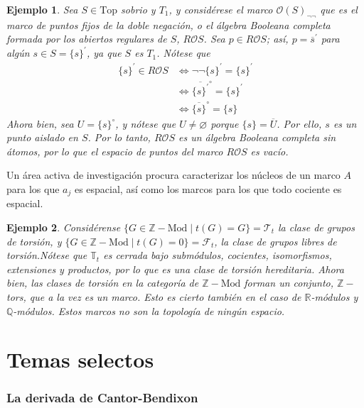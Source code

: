 \documentclass[12pt,letterpaper,titlepage]{article}
\let\emptyset\varnothing
\newtheorem*{exa}{Ejemplo}
\theoremstyle{definition}
\newcommand\<{\langle}
\renewcommand\>{\rangle}
\newcommand{\Top}{\mathrm{Top}}
\begin{document}
 \begin{exa}
     Sea $S\in \Top$ sobrio y $T_1$, y considérese el marco $\mathcal{O}(S)_{\neg \neg}$ que es el marco de puntos fijos de la doble negación, o el álgebra Booleana completa formada por los abiertos regulares de $S$, $R\mathcal{O}S$.
     Sea $p\in R\mathcal{O}S$; así, $p=\overline{s}^{\prime}$ para algún $s\in S=\{s\}^{\prime}$, ya que $S$ es $T_1$. Nótese que \begin{align*}
         \{s\}^{\prime}\in R\mathcal{O}S&\iff \neg\neg \{s\}^\prime =\{s\}^\prime\\
         &\iff \overline{\{s\}^\prime}^\circ=\{s\}^\prime\\
         &\iff \overline{\{s\}}^\circ=\{s\}
     \end{align*}
Ahora bien, sea $U=\{s\}^\circ$, y nótese que $U\neq\emptyset$ porque $\{s\}=\overline{U}$. Por ello, $s$ es un punto aislado en $S$.  Por lo tanto, $R\mathcal{O}S$ es un álgebra Booleana completa sin átomos, por lo que el espacio de puntos del marco $R\mathcal{O}S$ es vacío.
 \end{exa}
 Un área activa de investigación procura caracterizar los núcleos de un marco $A$ para los que $a_j$ es espacial, así como los marcos para los que todo cociente es espacial.
 
 \begin{exa}
 Considérense $\{G\in \mathbb{Z}-\text{Mod} \mid t(G)=G\}=\mathscr{T}_t$ la clase de grupos de torsión, y $\{G\in\mathbb{Z}-\text{Mod}\mid t(G)=0\}=\mathscr{F}_t$, la clase de grupos libres de torsión.Nótese que $\mathbb{T}_t$ es cerrada bajo submódulos, cocientes, isomorfismos, extensiones y productos, por lo que es una clase de torsión hereditaria.
 Ahora bien, las clases de torsión en la categoría de $\mathbb{Z}-\text{Mod}$ forman un conjunto, $\mathbb{Z}-$tors, que a la vez es un marco. Esto es cierto también en el caso de $\mathbb{R}$-módulos y $\mathbb{Q}$-módulos.
 Estos marcos no son la topología de ningún espacio.
 \end{exa}
\part{Temas selectos}

\section{La derivada de Cantor-Bendixon}

\end{document}
